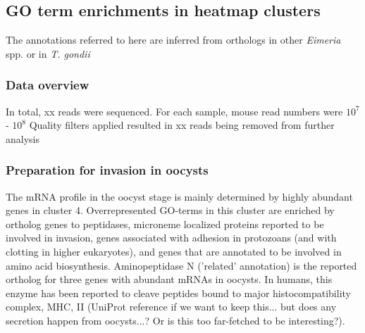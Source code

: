 \documentclass{bmcart}
\begin{document}


\clearpage
\subsection*{GO term enrichments in heatmap clusters}
The annotations referred to here are inferred from orthologs in other \textit{Eimeria} spp. or
in \textit{T. gondii}

\subsubsection*{Data overview}
In total, xx reads were sequenced. For each sample, mouse read numbers were $10^7$ - $10^8$
Quality filters applied resulted in xx reads being removed from further analysis

\subsubsection*{Preparation for invasion in oocysts}
The mRNA profile in the oocyst stage is mainly determined by highly abundant genes in cluster 4.
Overrepresented GO-terms in this cluster are enriched by ortholog genes to 
peptidases, microneme localized proteins reported to be involved in invasion, 
genes associated with adhesion in protozoans (and with clotting in higher eukaryotes),
and genes that are annotated to be involved in amino acid biosynthesis.
  Aminopeptidase N ('related' annotation) is the reported ortholog for three genes with 
abundant mRNAs in oocysts. In humans, this enzyme has been reported to cleave peptides bound to 
major histocompatibility complex, MHC, II (UniProt reference if we want to keep this... but does any
secretion happen from oocysts...? Or is this too far-fetched to be interesting?).
\end{document}
